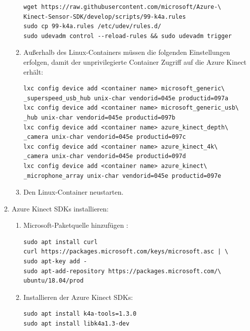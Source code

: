 \begin{enumerate}[label*=\arabic*.]
\begin{enumerate}[label*=\arabic*.]
                \begin{lstlisting}[style=bash]
wget https://raw.githubusercontent.com/microsoft/Azure-\
Kinect-Sensor-SDK/develop/scripts/99-k4a.rules
sudo cp 99-k4a.rules /etc/udev/rules.d/
sudo udevadm control --reload-rules && sudo udevadm trigger
                \end{lstlisting}

            \item Außerhalb des Linux-Containers müssen die folgenden Einstellungen erfolgen, damit der unprivilegierte Container Zugriff auf die Azure Kinect erhält:
                \begin{lstlisting}[style=bash]
lxc config device add <container name> microsoft_generic\
_superspeed_usb_hub unix-char vendorid=045e productid=097a
lxc config device add <container name> microsoft_generic_usb\
_hub unix-char vendorid=045e productid=097b
lxc config device add <container name> azure_kinect_depth\
_camera unix-char vendorid=045e productid=097c
lxc config device add <container name> azure_kinect_4k\
_camera unix-char vendorid=045e productid=097d
lxc config device add <container name> azure_kinect\
_microphone_array unix-char vendorid=045e productid=097e
                \end{lstlisting}

            \item Den Linux-Container neustarten.
        \end{enumerate}

    \item Azure Kinect SDKs installieren:
        \begin{enumerate}[label*=\arabic*.]
            \item Microsoft-Paketquelle hinzufügen \cite{microsoftazure-kinect-sensor-sdk_installation_nodate}:
                \begin{lstlisting}[style=bash]
sudo apt install curl
curl https://packages.microsoft.com/keys/microsoft.asc | \
sudo apt-key add -
sudo apt-add-repository https://packages.microsoft.com/\
ubuntu/18.04/prod
                \end{lstlisting}

            \item Installieren der Azure Kinect SDKs:
                \begin{lstlisting}[style=bash]
sudo apt install k4a-tools=1.3.0
sudo apt install libk4a1.3-dev
                \end{lstlisting}


\end{enumerate}
\end{enumerate}
